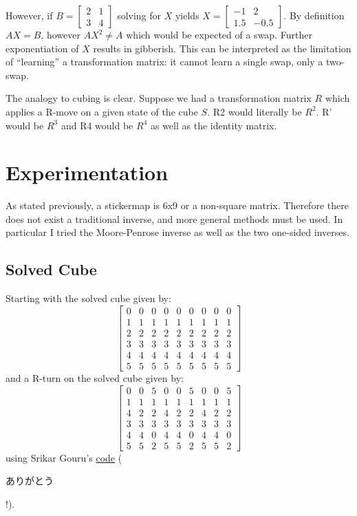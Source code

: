 \documentclass[11pt, oneside]{article}
\begin{document}
However, if \( B = \begin{bmatrix} 2 & 1 \\ 3 & 4 \end{bmatrix} \) solving for \( X \) yields \( X = \begin{bmatrix} -1 & 2 \\ 1.5 & -0.5 \end{bmatrix} \).
By definition \( A X = B \), however \( A X^2 \neq A \) which would be expected of a swap. Further exponentiation of \( X \) results in gibberish.
This can be interpreted as the limitation of ``learning'' a transformation matrix: it cannot learn a single swap, only a two-swap.

The analogy to cubing is clear. Suppose we had a transformation matrix \( R \) which applies a R-move on a given state of the cube \( S \). R2 would literally be \( R^2 \).
R' would be \( R^3 \) and R4 would be \( R^4 \) as well as the identity matrix.

\section{Experimentation}

As stated previously, a stickermap is 6x9 or a non-square matrix. Therefore there does not exist a traditional inverse, and more general methods must be used. In particular I tried
the Moore-Penrose inverse as well as the two one-sided inverses.

\subsection{Solved Cube}
Starting with the solved cube given by:
\[ \begin{bmatrix} 0 & 0 & 0 & 0 & 0 & 0 & 0 & 0 & 0 \\ 1 & 1 & 1 & 1 & 1 & 1 & 1 & 1 & 1 \\ 2 & 2 & 2 & 2 & 2 & 2 & 2 & 2 & 2 \\ 3 & 3 & 3 & 3 & 3 & 3 & 3 & 3 & 3 \\ 4 & 4 & 4 & 4 &
4 & 4 & 4 & 4 & 4 \\ 5 & 5 & 5 & 5 & 5 & 5 & 5 & 5 & 5 \end{bmatrix} \]
and a R-turn on the solved cube given by:
\[ \begin{bmatrix} 0 & 0 & 5 & 0 & 0 & 5 & 0 & 0 & 5 \\1 & 1 & 1 & 1 & 1 & 1 & 1 & 1 & 1 \\4 & 2 & 2 & 4 & 2 & 2 & 4 & 2 & 2 \\3 & 3 & 3 & 3 & 3 & 3 & 3 & 3 & 3 \\4 & 4 & 0 & 4 & 4 & 0 & 4 & 4 & 0 \\5 & 5 & 2 & 5 & 5 & 2 & 5 & 5 & 2 \end{bmatrix} \]
using Srikar Gouru's \href{https://github.com/srikarg89/RubiksCubeSolver-JS}{code} (\begin{CJK}{UTF8}{maru} ありがとう \end{CJK}!).
\end{document}
